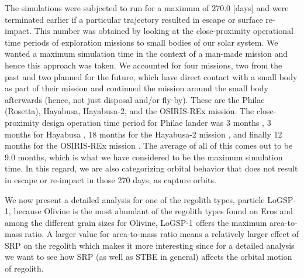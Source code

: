 The simulations were subjected to run for a maximum of 270.0 [days] and were terminated earlier if a particular trajectory resulted in escape or surface re-impact. This number was obtained by looking at the close-proximity operational time periods of exploration missions to small bodies of our solar system. We wanted a maximum simulation time in the context of a man-made mission and hence this approach was taken. We accounted for four missions, two from the past and two planned for the future, which have direct contact with a small body as part of their mission and continued the mission around the small body afterwards (hence, not just disposal and/or fly-by). These are the Philae (Rosetta), Hayabusa, Hayabusa-2, and the \gls{OSIRIS-REx} mission. The close-proximity design operation time period for Philae lander was 3 months \parencite{philaeMissionTimeline}, 3 months for Hayabusa \parencite{hayabusaCloseProximity}, 18 months for the Hayabusa-2 mission \parencite{hayabusa2CloseProximity}, and finally 12 months for the \gls{OSIRIS-REx} mission \parencite{osirisMissionOverview}. The average of all of this comes out to be 9.0 months, which is what we have considered to be the maximum simulation time. In this regard, we are also categorizing orbital behavior that does not result in escape or re-impact in those 270 days, as capture orbits.

We now present a detailed analysis for one of the regolith types, particle LoGSP-1, because Olivine is the most abundant of the regolith types found on Eros and among the different grain sizes for Olivine, LoGSP-1 offers the maximum area-to-mass ratio. A larger value for area-to-mass ratio means a relatively larger effect of \gls{SRP} on the regolith which makes it more interesting since for a detailed analysis we want to see how \gls{SRP} (as well as \gls{STBE} in general) affects the orbital motion of regolith.

